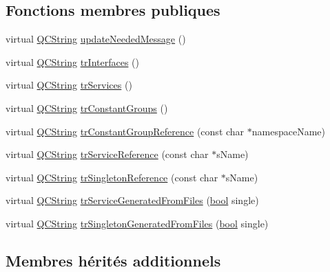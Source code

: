 \subsection*{Fonctions membres publiques}
\begin{DoxyCompactItemize}
\item 
virtual \hyperlink{class_q_c_string}{Q\+C\+String} \hyperlink{class_translator_adapter__1__8__4_a87dbcf9a99bf2ddfd9593461d331b714}{update\+Needed\+Message} ()
\item 
virtual \hyperlink{class_q_c_string}{Q\+C\+String} \hyperlink{class_translator_adapter__1__8__4_a9bed6b9e7675c823022339b518421a66}{tr\+Interfaces} ()
\item 
virtual \hyperlink{class_q_c_string}{Q\+C\+String} \hyperlink{class_translator_adapter__1__8__4_a8fb11db78b8f48b000a8f59f2d371b88}{tr\+Services} ()
\item 
virtual \hyperlink{class_q_c_string}{Q\+C\+String} \hyperlink{class_translator_adapter__1__8__4_aa07851abe1843c4c8530164a62924c18}{tr\+Constant\+Groups} ()
\item 
virtual \hyperlink{class_q_c_string}{Q\+C\+String} \hyperlink{class_translator_adapter__1__8__4_a29436fe42b5d4019bccd69ea0f76df11}{tr\+Constant\+Group\+Reference} (const char $\ast$namespace\+Name)
\item 
virtual \hyperlink{class_q_c_string}{Q\+C\+String} \hyperlink{class_translator_adapter__1__8__4_a7c2596ce1d0872da3e22cb33ec32a57c}{tr\+Service\+Reference} (const char $\ast$s\+Name)
\item 
virtual \hyperlink{class_q_c_string}{Q\+C\+String} \hyperlink{class_translator_adapter__1__8__4_a916e58d54ae15e3d99b134e1d45e2db3}{tr\+Singleton\+Reference} (const char $\ast$s\+Name)
\item 
virtual \hyperlink{class_q_c_string}{Q\+C\+String} \hyperlink{class_translator_adapter__1__8__4_a5b2a344738143665e24d41da7a32a4d8}{tr\+Service\+Generated\+From\+Files} (\hyperlink{qglobal_8h_a1062901a7428fdd9c7f180f5e01ea056}{bool} single)
\item 
virtual \hyperlink{class_q_c_string}{Q\+C\+String} \hyperlink{class_translator_adapter__1__8__4_a97a9aea944d6ef3b39c40bd01a62fdbc}{tr\+Singleton\+Generated\+From\+Files} (\hyperlink{qglobal_8h_a1062901a7428fdd9c7f180f5e01ea056}{bool} single)
\end{DoxyCompactItemize}
\subsection*{Membres hérités additionnels}


